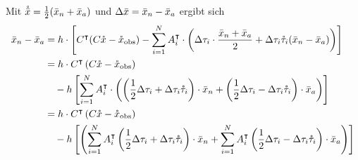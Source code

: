 Mit $\mathring{\bar{x}} =\frac{1}{2}(\bar{x}_n + \bar{x}_a) $ und $\Delta \bar{x} =\bar{x}_n - \bar{x}_a $ ergibt sich
\allowdisplaybreaks
\begin{align*}
\bar{x}_n - \bar{x}_a &= h\cdot \left[C^\intercal(C\mathring{x} -\mathring{x}_{\text{obs}}) - \sum_{i=1}^N A_i^\intercal \cdot \left( \Delta \tau_i\cdot \frac{\bar{x}_n + \bar{x}_a}{2} +  \Delta \tau_i \mathring{\tau}_i (\bar{x}_n - \bar{x}_a) \right)\right]\\
 &= h\cdot C^\intercal\left(C\mathring{x} -\mathring{x}_{\text{obs}}\right) \\
 &\quad-h\left[\sum_{i=1}^N A_i^\intercal \cdot \left( \left(\frac{1}{2} \Delta \tau_i +\Delta \tau_i \mathring{\tau}_i\right) \cdot \bar{x}_n  +  \left(\frac{1}{2}\Delta \tau_i-\Delta \tau_i \mathring{\tau}_i\right) \cdot \bar{x}_a \right)\right]\\
 &= h\cdot C^\intercal\left(C\mathring{x} -\mathring{x}_{\text{obs}} \right)\\
 &\quad-h \left[\left( \sum_{i=1}^N A_i^\intercal \left(\frac{1}{2} \Delta \tau_i +\Delta \tau_i \mathring{\tau}_i\right) \cdot \bar{x}_n  + \sum_{i=1}^N A_i^\intercal  \left(\frac{1}{2}\Delta \tau_i-\Delta \tau_i \mathring{\tau}_i\right) \cdot \bar{x}_a \right)\right]\\
\end{align*}
 
